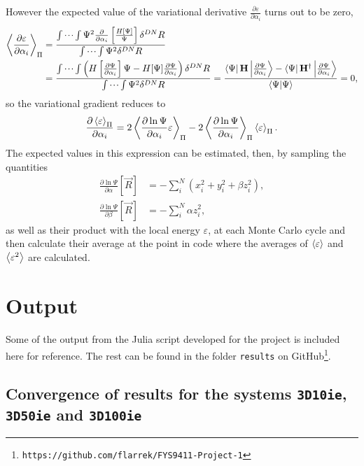 \documentclass[a4paper,8pt]{article}
\begin{document}
However the expected value of the variational derivative $\frac{\partial\varepsilon}{\partial\alpha_i}$ turns out to be zero,
\begin{align}
\ev{\frac{\partial\varepsilon}{\partial\alpha_i}}_\Pi &= \frac{\idotsint\Psi^2\frac{\partial}{\partial\alpha_i}\left[\frac{H[\Psi]}{\Psi}\right]\delta^{DN}R}{\idotsint \Psi^2 \delta^{DN}R} \nonumber\\
&= \frac{\idotsint\left(H\left[\frac{\partial\Psi}{\partial\alpha_i}\right]\Psi-H[\Psi]\frac{\partial\Psi}{\partial\alpha_i}\right)\delta^{DN}R}{\idotsint \Psi^2 \delta^{DN}R} = \frac{\bra{\Psi}\mathbf{H}\ket{\frac{\partial\Psi}{\partial\alpha_i}}-\bra{\Psi}\mathbf{H}^\dagger\ket{\frac{\partial\Psi}{\partial\alpha_i}}}{\braket{\Psi}{\Psi}} = 0,
\end{align}
so the variational gradient reduces to
\begin{equation}
\frac{\partial\ev{\varepsilon}_\Pi}{\partial\alpha_i} = 2\ev{\frac{\partial\ln\Psi}{\partial\alpha_i}\varepsilon}_\Pi-2\ev{\frac{\partial\ln\Psi}{\partial\alpha_i}}_\Pi\ev{\varepsilon}_\Pi.
\end{equation}
The expected values in this expression can be estimated, then, by sampling the quantities
\begin{align}
\frac{\partial\ln\Psi}{\partial\alpha}[\vec{R}] &= -\sum\limits_i^N \left(x_i^2 + y_i^2 + \beta z_i^2\right), \label{compAlphaGrad}\\
\frac{\partial\ln\Psi}{\partial\beta}[\vec{R}] &= -\sum\limits_i^N \alpha z_i^2, \label{compBetaGrad}
\end{align}
as well as their product with the local energy $\varepsilon$, at each Monte Carlo cycle and then calculate their average at the point in code where the averages of $\ev{\varepsilon}$ and $\ev{\varepsilon^2}$ are calculated.


\newpage
\section{Output}\label{output}
Some of the output from the Julia script developed for the project is included here for reference. The rest can be found in the folder \texttt{results} on GitHub\footnote{\texttt{https://github.com/flarrek/FYS9411-Project-1}}.

\subsection{Convergence of results for the systems \texttt{3D10ie}, \texttt{3D50ie} and \texttt{3D100ie}}\label{convOutput}
\end{document}
